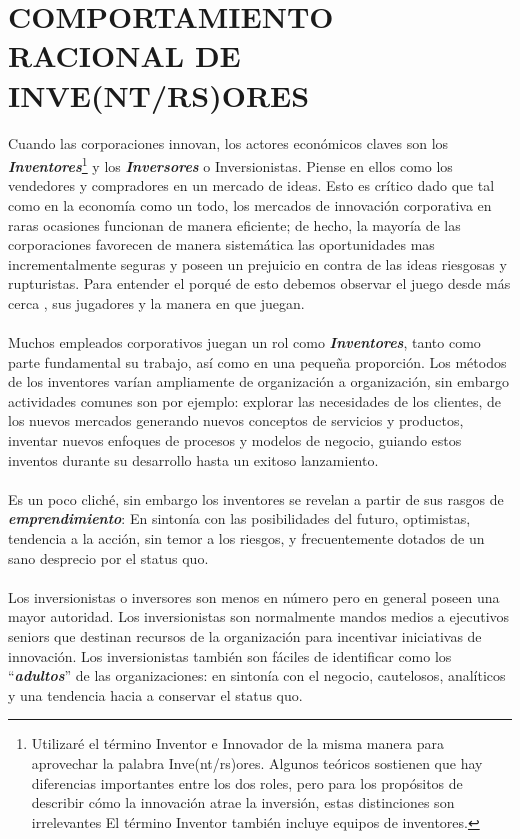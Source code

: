 \documentclass{article}
\begin{document}
\clearpage
\section{COMPORTAMIENTO RACIONAL DE INVE(NT/RS)ORES}

Cuando las corporaciones innovan, los actores econ\'omicos claves son los \textbf{\textit{Inventores}}\footnote{Utilizar\'e el t\'ermino Inventor e Innovador de la misma manera para aprovechar la palabra Inve(nt/rs)ores. Algunos te\'oricos sostienen que hay diferencias importantes entre los dos roles, pero para los prop\'ositos de describir c\'omo la innovaci\'on atrae la inversi\'on, estas distinciones son irrelevantes El t\'ermino Inventor tambi\'en incluye equipos de inventores.} y los \textbf{\textit{Inversores}} o Inversionistas. Piense en ellos como los vendedores y compradores en un mercado de ideas. Esto es cr\'itico dado que tal como en la econom\'ia como un todo, los mercados de innovaci\'on corporativa en raras ocasiones funcionan de manera eficiente; de hecho, la mayor\'ia de las corporaciones favorecen de manera sistem\'atica las oportunidades mas incrementalmente seguras y poseen un prejuicio en contra de las ideas riesgosas y rupturistas. Para entender el porqu\'e de esto debemos observar el juego desde m\'as cerca , sus jugadores y la manera en que juegan.
\\ \\
Muchos empleados corporativos juegan un rol como \textbf{\textit{Inventores}}, tanto como parte fundamental su trabajo, as\'i como en una peque\~na proporci\'on. Los m\'etodos de los inventores var\'ian ampliamente de organizaci\'on a organizaci\'on, sin embargo actividades comunes son por ejemplo: explorar las necesidades de los clientes, de los nuevos mercados generando nuevos conceptos de servicios y productos, inventar nuevos enfoques de procesos y modelos de negocio, guiando estos inventos durante su desarrollo hasta un exitoso lanzamiento.
\\ \\
Es un poco clich\'e, sin embargo los inventores se revelan a partir de sus rasgos de \textbf{\textit{emprendimiento}}: En sinton\'ia con las posibilidades del futuro, optimistas, tendencia a la acci\'on, sin temor a los riesgos, y frecuentemente dotados de un sano desprecio por el status quo.
\\ \\
Los inversionistas o inversores son menos en n\'umero pero en general poseen una mayor autoridad. Los inversionistas son normalmente mandos medios a ejecutivos seniors que destinan recursos de la organizaci\'on para incentivar iniciativas de innovaci\'on. Los inversionistas tambi\'en son f\'aciles de identificar como los ``\textbf{\textit{adultos}}'' de las organizaciones: en sinton\'ia con el negocio, cautelosos, anal\'iticos y una tendencia hacia a conservar el status quo.
\end{document}
